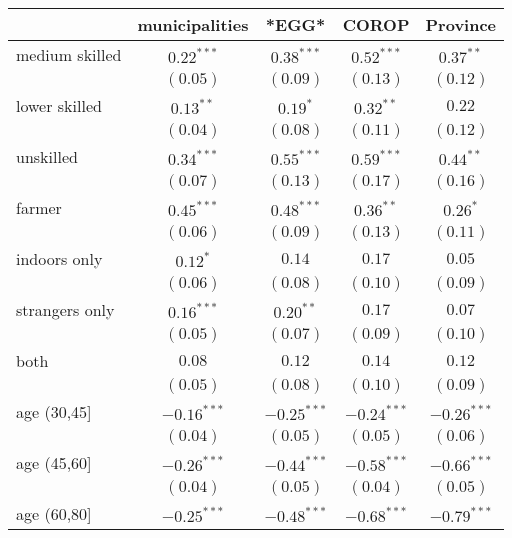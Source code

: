 
\begin{table}
\begin{center}
\begin{tabular}{l c c c c}
\hline
 & municipalities & *EGG* & COROP & Province \\
\hline
medium skilled     & $0.22^{***}$  & $0.38^{***}$  & $0.52^{***}$  & $0.37^{**}$   \\
                   & $(0.05)$      & $(0.09)$      & $(0.13)$      & $(0.12)$      \\
lower skilled      & $0.13^{**}$   & $0.19^{*}$    & $0.32^{**}$   & $0.22$        \\
                   & $(0.04)$      & $(0.08)$      & $(0.11)$      & $(0.12)$      \\
unskilled          & $0.34^{***}$  & $0.55^{***}$  & $0.59^{***}$  & $0.44^{**}$   \\
                   & $(0.07)$      & $(0.13)$      & $(0.17)$      & $(0.16)$      \\
farmer             & $0.45^{***}$  & $0.48^{***}$  & $0.36^{**}$   & $0.26^{*}$    \\
                   & $(0.06)$      & $(0.09)$      & $(0.13)$      & $(0.11)$      \\
indoors only       & $0.12^{*}$    & $0.14$        & $0.17$        & $0.05$        \\
                   & $(0.06)$      & $(0.08)$      & $(0.10)$      & $(0.09)$      \\
strangers only     & $0.16^{***}$  & $0.20^{**}$   & $0.17$        & $0.07$        \\
                   & $(0.05)$      & $(0.07)$      & $(0.09)$      & $(0.10)$      \\
both               & $0.08$        & $0.12$        & $0.14$        & $0.12$        \\
                   & $(0.05)$      & $(0.08)$      & $(0.10)$      & $(0.09)$      \\
age (30,45]        & $-0.16^{***}$ & $-0.25^{***}$ & $-0.24^{***}$ & $-0.26^{***}$ \\
                   & $(0.04)$      & $(0.05)$      & $(0.05)$      & $(0.06)$      \\
age (45,60]        & $-0.26^{***}$ & $-0.44^{***}$ & $-0.58^{***}$ & $-0.66^{***}$ \\
                   & $(0.04)$      & $(0.05)$      & $(0.04)$      & $(0.05)$      \\
age (60,80]        & $-0.25^{***}$ & $-0.48^{***}$ & $-0.68^{***}$ & $-0.79^{***}$ \\

\end{tabular}
\end{center}
\end{table}
